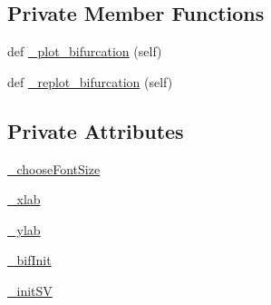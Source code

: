 \subsection*{Private Member Functions}
\begin{DoxyCompactItemize}
\item 
def \hyperlink{class_mu_mo_t_1_1_mu_mo_tbifurcation_view_a385e5f82733060fec5122635ae6a8e67}{\+\_\+plot\+\_\+bifurcation} (self)
\item 
def \hyperlink{class_mu_mo_t_1_1_mu_mo_tbifurcation_view_a13b207330e0a4fe5bb7c3b863bbd0820}{\+\_\+replot\+\_\+bifurcation} (self)
\end{DoxyCompactItemize}
\subsection*{Private Attributes}
\begin{DoxyCompactItemize}
\item 
\hyperlink{class_mu_mo_t_1_1_mu_mo_tbifurcation_view_a6a353a1ef9443ae375948d592ed6cec6}{\+\_\+choose\+Font\+Size}
\item 
\hyperlink{class_mu_mo_t_1_1_mu_mo_tbifurcation_view_a865b2109ba10d874e84d4a354873b121}{\+\_\+xlab}
\item 
\hyperlink{class_mu_mo_t_1_1_mu_mo_tbifurcation_view_aac1a25a634d53e524573f67eb5f3a7b9}{\+\_\+ylab}
\item 
\hyperlink{class_mu_mo_t_1_1_mu_mo_tbifurcation_view_a16ef7868ecc22fd59dcacbb01e743f80}{\+\_\+bif\+Init}
\item 
\hyperlink{class_mu_mo_t_1_1_mu_mo_tbifurcation_view_a5c3de6779b1f8c64730cee48ca65491d}{\+\_\+init\+SV}
\end{DoxyCompactItemize}
